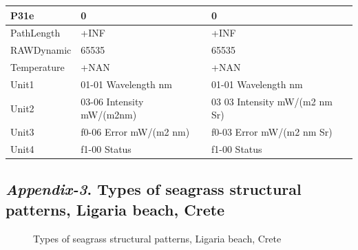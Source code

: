 \documentclass[10pt, a4paper]{article}
\begin{document}
\begin{appendices}
\begin{table}[H]
\begin{tabular}{| p{3cm} | p{3cm} | p{5cm} |}
	   P31e & 0 & 0 \\ \hline
	   PathLength & +INF & +INF \\ \hline
	   RAWDynamic & 65535 & 65535 \\ \hline
	   Temperature & +NAN & +NAN \\ \hline
	   Unit1 & 01-01 Wavelength nm &  01-01 Wavelength nm \\ \hline
	   Unit2 & 03-06 Intensity mW/(m2nm) & 03 03 Intensity mW/(m2 nm Sr) \\ \hline
	   Unit3 & f0-06 Error mW/(m2 nm) & f0-03 Error mW/(m2 nm Sr) \\ \hline
	  Unit4 & f1-00 Status & f1-00 Status \\ \hline
	\end{tabular}
\end{table}
\pagebreak

\subsection[\textit{Appendix-3}. Types of seagrass structural patterns]{\textit{Appendix-3}. Types of seagrass structural patterns, Ligaria beach, Crete}

\begin{figure}[h]
	\centering
	\hspace{1mm}
	\hspace{1mm}
	\caption{Types of seagrass structural patterns, Ligaria beach, Crete}
	\label{fig:A.3}
\end{figure}


\end{appendices}
\end{document}
